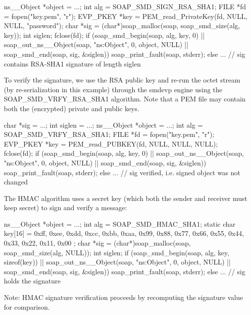 \begin{DoxyCode}
    ns__Object *object = ...;
    int alg = SOAP_SMD_SIGN_RSA_SHA1;
    FILE *fd = fopen("key.pem", "r");
    EVP_PKEY *key = PEM_read_PrivateKey(fd, NULL, NULL, "password");
    char *sig = (char*)soap_malloc(soap, soap_smd_size(alg, key));
    int siglen;
    fclose(fd);
    if (soap_smd_begin(soap, alg, key, 0)
     || soap_out_ns__Object(soap, "ns:Object", 0, object, NULL)
     || soap_smd_end(soap, sig, &siglen))
      soap_print_fault(soap, stderr);
    else
      ... // sig contains RSA-SHA1 signature of length siglen 
\end{DoxyCode}


To verify the signature, we use the RSA public key and re-\/run the octet stream (by re-\/serialization in this example) through the smdevp engine using the SOAP\_\-SMD\_\-VRFY\_\-RSA\_\-SHA1 algorithm. Note that a PEM file may contain both the (encrypted) private and public keys.


\begin{DoxyCode}
    char *sig = ...;
    int siglen = ...;
    ns__Object *object = ...;
    int alg = SOAP_SMD_VRFY_RSA_SHA1;
    FILE *fd = fopen("key.pem", "r");
    EVP_PKEY *key = PEM_read_PUBKEY(fd, NULL, NULL, NULL);
    fclose(fd);
    if (soap_smd_begin(soap, alg, key, 0)
     || soap_out_ns__Object(soap, "ns:Object", 0, object, NULL)
     || soap_smd_end(soap, sig, &siglen))
      soap_print_fault(soap, stderr);
    else
      ... // sig verified, i.e. signed object was not changed
\end{DoxyCode}


The HMAC algorithm uses a secret key (which both the sender and receiver must keep secret) to sign and verify a message:


\begin{DoxyCode}
    ns__Object *object = ...;
    int alg = SOAP_SMD_HMAC_SHA1;
    static char key[16] =
    { 0xff, 0xee, 0xdd, 0xcc, 0xbb, 0xaa, 0x99, 0x88,
      0x77, 0x66, 0x55, 0x44, 0x33, 0x22, 0x11, 0x00 };
    char *sig = (char*)soap_malloc(soap, soap_smd_size(alg, NULL));
    int siglen;
    if (soap_smd_begin(soap, alg, key, sizeof(key))
     || soap_out_ns__Object(soap, "ns:Object", 0, object, NULL)
     || soap_smd_end(soap, sig, &siglen))
      soap_print_fault(soap, stderr);
    else
      ... // sig holds the signature
\end{DoxyCode}


Note: HMAC signature verification proceeds by recomputing the signature value for comparison.

